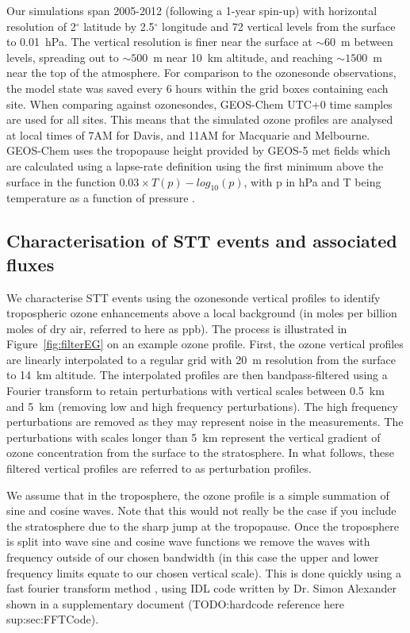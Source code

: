\documentclass[acp, manuscript]{copernicus} %
\begin{document}
    Our simulations span 2005-2012 (following a 1-year spin-up) with horizontal resolution of 2$^{\circ}$ latitude by 2.5$^{\circ}$ longitude and 72 vertical levels from the surface to 0.01~hPa.
    The vertical resolution is finer near the surface at $\sim 60$~m between levels, spreading out to $\sim 500$~m near 10~km altitude, and reaching $\sim 1500$~m near the top of the atmosphere.
    For comparison to the ozonesonde observations, the model state was saved every 6 hours within the grid boxes containing each site.
    When comparing against ozonesondes, GEOS-Chem UTC+0 time samples are used for all sites.
    This means that the simulated ozone profiles are analysed at local times of 7AM for Davis, and 11AM for Macquarie and Melbourne.
    GEOS-Chem uses the tropopause height provided by GEOS-5 met fields which are calculated using a lapse-rate definition using the first minimum above the surface in the function $0.03 \times T(p) - log_{10}(p)$, with p in hPa and T being temperature as a function of pressure \citep{Rienecker2008}.
    
  \subsection{Characterisation of STT events and associated fluxes}
    \label{sec:CharacterisationOfSTTs}
    
    We characterise STT events using the ozonesonde vertical profiles to identify tropospheric ozone enhancements above a local background (in moles per billion moles of dry air, referred to here as ppb).
    The process is illustrated in Figure~\ref{fig:filterEG} on an example ozone profile.
    First, the ozone vertical profiles are linearly interpolated to a regular grid with 20~m resolution from the surface to 14~km altitude. 
    The interpolated profiles are then bandpass-filtered using a Fourier transform to retain perturbations with vertical scales between 0.5~km and 5~km (removing low and high frequency perturbations).
    The high frequency perturbations are removed as they may represent noise in the measurements. The perturbations with scales longer than 5~km represent the vertical gradient of ozone concentration from the surface to the stratosphere.
    In what follows, these filtered vertical profiles are referred to as perturbation profiles.
    
    We assume that in the troposphere, the ozone profile is a simple summation of sine and cosine waves.
    Note that this would not really be the case if you include the stratosphere due to the sharp jump at the tropopause.
    Once the troposphere is split into wave sine and cosine wave functions we remove the waves with frequency outside of our chosen bandwidth (in this case the upper and lower frequency limits equate to our chosen vertical scale).
    This is done quickly using a fast fourier transform method \citep{Press1992}, using IDL code written by Dr. Simon Alexander shown in a supplementary document (TODO:hardcode reference here sup:sec:FFTCode).
    
\end{document}
